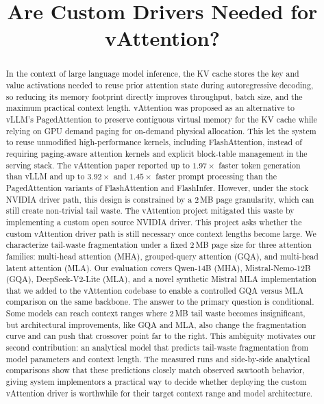 \documentclass[conference]{IEEEtran}
\title{Are Custom Drivers Needed for vAttention?}
\author{\IEEEauthorblockN{Project Team}
\IEEEauthorblockA{CDA 5106 Course Project}}
\begin{document}
\maketitle

\begin{abstract}
In the context of large language model inference, the 
KV cache stores the key and value activations needed to reuse 
prior attention state during autoregressive decoding, so 
reducing its memory footprint directly improves throughput, 
batch size, and the maximum practical context length. 
vAttention was proposed as an alternative to vLLM's PagedAttention to 
preserve contiguous virtual memory for the KV cache while 
relying on GPU demand paging for on-demand physical allocation. 
This let the system to reuse unmodified high-performance kernels, 
including FlashAttention, instead of requiring paging-aware 
attention kernels and explicit block-table management in the 
serving stack. The vAttention paper reported up to $1.97\times$ 
faster token generation than vLLM and up to $3.92\times$ and 
$1.45\times$ faster prompt processing than the PagedAttention 
variants of FlashAttention and FlashInfer. However, under 
the stock NVIDIA driver path, this design is constrained 
by a 2\,MB page granularity, which can still create non-trivial 
tail waste. The vAttention project mitigated this waste by implementing 
a custom open source NVIDIA driver.
This project asks whether the custom vAttention driver path 
is still necessary once context lengths become large. 
We characterize tail-waste fragmentation under a fixed 2\,MB 
page size for three attention families: multi-head attention (MHA), 
grouped-query attention (GQA), and multi-head latent attention (MLA). 
Our evaluation covers Qwen-14B (MHA), Mistral-Nemo-12B (GQA), 
DeepSeek-V2-Lite (MLA), and a novel synthetic Mistral MLA 
implementation that we added to the vAttention codebase 
to enable a controlled GQA versus MLA comparison on the same backbone. 
The answer to the primary question is conditional. 
Some models can reach context ranges where 2\,MB tail 
waste becomes insignificant, but architectural improvements, like GQA and MLA,
also change the fragmentation curve and can push that crossover 
point far to the right. This ambiguity motivates our second 
contribution: an analytical model that predicts tail-waste fragmentation 
from model parameters and context length. The measured runs and 
side-by-side analytical comparisons show that these predictions 
closely match observed sawtooth behavior, giving system implementors a 
practical way to decide whether deploying the custom vAttention 
driver is worthwhile for their target context range and model architecture.
\end{abstract}
\end{document}
